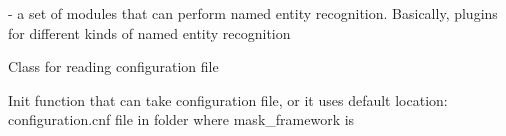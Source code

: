 \documentclass[letterpaper,10pt,english]{sphinxmanual}
\begin{document}
\label{\detokenize{index:module-ner_plugins}}
 - a set of modules that can perform named entity recognition. Basically, plugins for different kinds of named entity recognition

\label{\detokenize{index:module-masking_plugins}}

\begin{fulllineitems}
Class for reading configuration file

Init function that can take configuration file, or it uses default location: configuration.cnf file in folder
where mask\_framework is

\end{fulllineitems}

\end{document}
